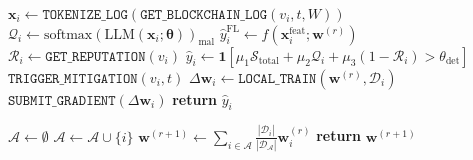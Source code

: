 \documentclass[12pt, a4paper]{report}
\begin{document}
\begin{algorithm}[htb]
\caption{Full-Version LLM + Federated Learning Detection Pipeline (\texttt{FV-Det})}
\begin{algorithmic}[1]
\small
{}
  \State $\mathbf{x}_i \gets \texttt{TOKENIZE\_LOG}(\texttt{GET\_BLOCKCHAIN\_LOG}(v_i, t, W))$
  \State $\mathcal{Q}_i \gets \text{softmax}(\text{LLM}(\mathbf{x}_i; \boldsymbol{\theta}))_{\text{mal}}$
  \State $\hat{y}_i^{\text{FL}} \gets f(\mathbf{x}_i^{\text{feat}}; \mathbf{w}^{(r)})$
  \State $\mathcal{R}_i \gets \texttt{GET\_REPUTATION}(v_i)$
  \State $\hat{y}_i \gets \mathbf{1}[\mu_1 \mathcal{S}_{\text{total}} + \mu_2 \mathcal{Q}_i + \mu_3(1-\mathcal{R}_i) > \theta_{\text{det}}]$
    \State $\texttt{TRIGGER\_MITIGATION}(v_i, t)$
  \Else
    \State $\Delta\mathbf{w}_i \gets \texttt{LOCAL\_TRAIN}(\mathbf{w}^{(r)}, \mathcal{D}_i)$
    \State $\texttt{SUBMIT\_GRADIENT}(\Delta\mathbf{w}_i)$
  \EndIf
  \State \textbf{return} $\hat{y}_i$
\EndProcedure

\vspace{0.5em}
  \State $\mathcal{A} \gets \emptyset$
      \State $\mathcal{A} \gets \mathcal{A} \cup \{i\}$
    \EndIf
  \EndFor
  \State $\mathbf{w}^{(r+1)} \gets \sum_{i \in \mathcal{A}} \frac{|\mathcal{D}_i|}{|\mathcal{D}_\mathcal{A}|} \mathbf{w}_i^{(r)}$
  \State \textbf{return} $\mathbf{w}^{(r+1)}$
\EndProcedure
\end{algorithmic}
\label{alg:fv_det}
\end{algorithm}


\newpage
\end{document}
